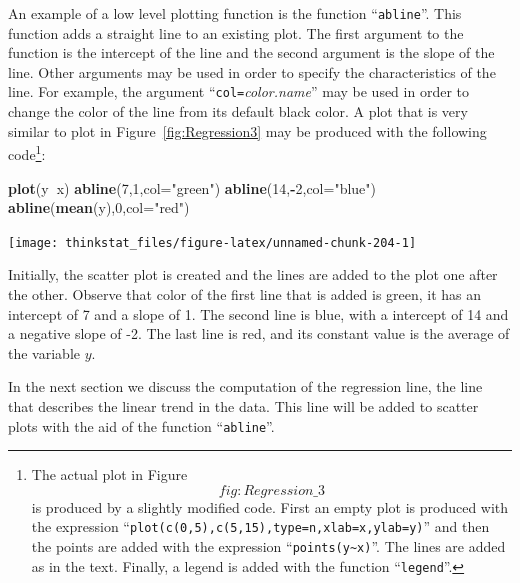 \documentclass[]{krantz}
\makeatletter
\newenvironment{Shaded}{\begin{snugshade}}{\end{snugshade}}
\newcommand{\KeywordTok}[1]{\textcolor[rgb]{0.13,0.29,0.53}{\textbf{#1}}}
\newcommand{\DataTypeTok}[1]{\textcolor[rgb]{0.13,0.29,0.53}{#1}}
\newcommand{\DecValTok}[1]{\textcolor[rgb]{0.00,0.00,0.81}{#1}}
\newcommand{\StringTok}[1]{\textcolor[rgb]{0.31,0.60,0.02}{#1}}
\newcommand{\OperatorTok}[1]{\textcolor[rgb]{0.81,0.36,0.00}{\textbf{#1}}}
\newcommand{\NormalTok}[1]{#1}
\newenvironment{kframe}{%
\medskip{}
\setlength{\fboxsep}{.8em}
 \def\at@end@of@kframe{}%
 \ifinner\ifhmode%
  \def\at@end@of@kframe{\end{minipage}}%
  \begin{minipage}{\columnwidth}%
 \fi\fi%
 \def\FrameCommand##1{\hskip\@totalleftmargin \hskip-\fboxsep
 \colorbox{shadecolor}{##1}\hskip-\fboxsep
     \hskip-\linewidth \hskip-\@totalleftmargin \hskip\columnwidth}%
 \MakeFramed {\advance\hsize-\width
   \@totalleftmargin\z@ \linewidth\hsize
   \@setminipage}}%
 {\par\unskip\endMakeFramed%
 \at@end@of@kframe}
\renewenvironment{Shaded}{\begin{kframe}}{\end{kframe}}
\theoremstyle{definition}
\theoremstyle{definition}
\theoremstyle{definition}
\theoremstyle{remark}
\makeatother
\begin{document}
An example of a low level plotting function is the function
``\texttt{abline}''. This function adds a straight line to an existing
plot. The first argument to the function is the intercept of the line
and the second argument is the slope of the line. Other arguments may be
used in order to specify the characteristics of the line. For example,
the argument ``\texttt{col=}\emph{color.name}'' may be used in order to
change the color of the line from its default black color. A plot that
is very similar to plot in Figure~\ref{fig:Regression3} may be produced
with the following code\footnote{The actual plot in
  Figure~\[fig:Regression\_3\] is produced by a slightly modified code.
  First an empty plot is produced with the expression
  ``\texttt{plot(c(0,5),c(5,15),type=n,xlab=x,ylab=y)}'' and then the
  points are added with the expression
  ``\texttt{points(y\textasciitilde{}x)}''. The lines are added as in
  the text. Finally, a legend is added with the function
  ``\texttt{legend}''.}:

\begin{Shaded}
\begin{Highlighting}[]
\KeywordTok{plot}\NormalTok{(y}\OperatorTok{~}\NormalTok{x)}
\KeywordTok{abline}\NormalTok{(}\DecValTok{7}\NormalTok{,}\DecValTok{1}\NormalTok{,}\DataTypeTok{col=}\StringTok{"green"}\NormalTok{)}
\KeywordTok{abline}\NormalTok{(}\DecValTok{14}\NormalTok{,}\OperatorTok{-}\DecValTok{2}\NormalTok{,}\DataTypeTok{col=}\StringTok{"blue"}\NormalTok{)}
\KeywordTok{abline}\NormalTok{(}\KeywordTok{mean}\NormalTok{(y),}\DecValTok{0}\NormalTok{,}\DataTypeTok{col=}\StringTok{"red"}\NormalTok{)}
\end{Highlighting}
\end{Shaded}

\begin{center}\texttt{[image: thinkstat\_files/figure-latex/unnamed-chunk-204-1]} \end{center}

Initially, the scatter plot is created and the lines are added to the
plot one after the other. Observe that color of the first line that is
added is green, it has an intercept of 7 and a slope of 1. The second
line is blue, with a intercept of 14 and a negative slope of -2. The
last line is red, and its constant value is the average of the variable
\(y\).

In the next section we discuss the computation of the regression line,
the line that describes the linear trend in the data. This line will be
added to scatter plots with the aid of the function ``\texttt{abline}''.
\end{document}
